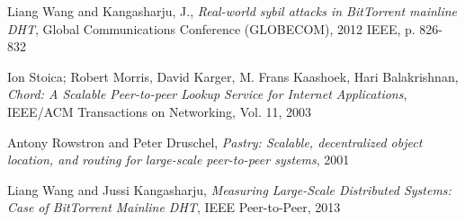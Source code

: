 \begin{thebibliography}{99}
Liang Wang and Kangasharju, J.,
\textit{Real-world sybil attacks in BitTorrent mainline DHT},
Global Communications Conference (GLOBECOM), 2012 IEEE, p. 826-832

  Ion Stoica; Robert Morris, David Karger, M. Frans Kaashoek, Hari Balakrishnan,
  \textit{Chord: A Scalable Peer-to-peer Lookup Service for Internet
  Applications},
  IEEE/ACM Transactions on Networking, Vol. 11, 2003

    Antony Rowstron and Peter Druschel,
    \textit{Pastry: Scalable, decentralized object location, and routing for
    large-scale peer-to-peer systems}, 2001

  Liang Wang and Jussi Kangasharju,
  \textit{Measuring Large-Scale Distributed Systems: Case of BitTorrent
  Mainline DHT}, 
  IEEE Peer-to-Peer, 2013
\end{thebibliography}
